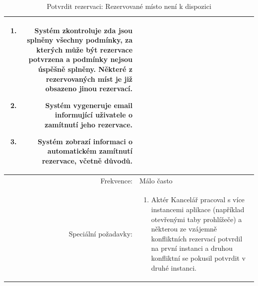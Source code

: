 \documentclass[a4paper,10pt]{article}
\begin{document}
\begin{table}[ht!]
{\begin{tabular}{| r | p{12cm} |}
\begin{minipage}[t]{0.75\textwidth}
\begin{enumerate}[nosep,after=\strut]
            \item Systém zkontroluje zda jsou splněny všechny podmínky, za kterých může být rezervace potvrzena a podmínky nejsou úspěšně splněny. Některé z rezervovaných míst je již obsazeno jinou rezervací.
            \item Systém vygeneruje email informující uživatele o zamítnutí jeho rezervace.
            \item Systém zobrazí informaci o automatickém zamítnutí rezervace, včetně důvodů.
    	\end{enumerate}
    \end{minipage} \\
    \hline
    Frekvence: & Málo často \\
    \hline
    Speciální požadavky: & 
    \begin{minipage}[t]{0.75\textwidth}
    	\begin{enumerate}[nosep,after=\strut]
    		\item Aktér Kancelář pracoval s více instancemi aplikace (například otevřenými taby prohlížeče) a některou ze vzájemně konfliktních rezervací potvrdil na první instanci a druhou konfliktní se pokusil potvrdit v druhé instanci.
    	\end{enumerate}
  	\end{minipage} \\
    \hline
\end{tabular}}
\caption{Potvrdit rezervaci: Rezervované místo není k dispozici}
\label{table:2}
\end{table}
\end{document}

